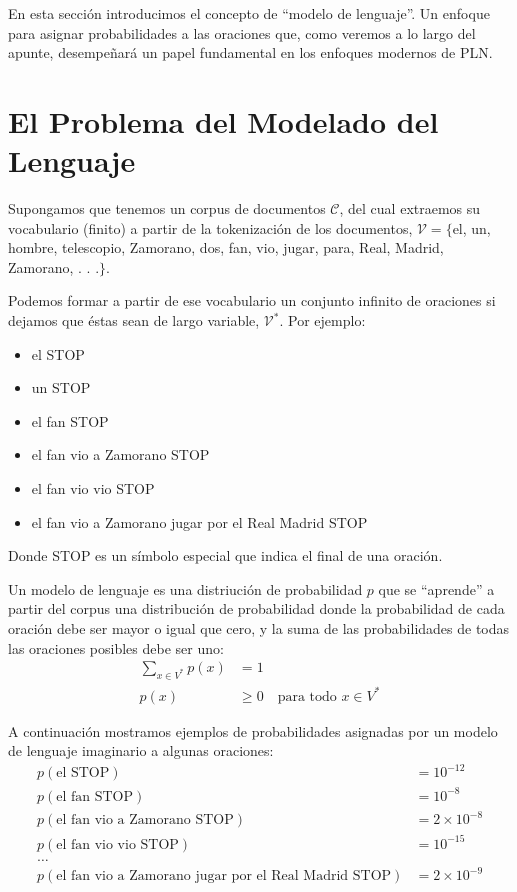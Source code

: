 En esta sección introducimos el concepto de ``modelo de lenguaje''. Un enfoque para asignar probabilidades a las oraciones que, como veremos a lo largo del apunte, desempeñará un papel fundamental en los enfoques modernos de PLN.

\section{El Problema del Modelado del Lenguaje}
Supongamos que tenemos un corpus de documentos $\mathcal{C}$, del cual extraemos su vocabulario (finito) a partir de la tokenización de los documentos, $\mathcal{V} = \{$el, un, hombre, telescopio, Zamorano, dos, fan, vio, jugar, para, Real, Madrid, Zamorano, . . .$\}$.

Podemos formar a partir de ese vocabulario un conjunto infinito de oraciones si dejamos que éstas sean de largo variable, $\mathcal{V}^*$.  Por ejemplo:
\begin{itemize}
\item el STOP
\item un STOP
\item el fan STOP
\item el fan vio a Zamorano STOP
\item el fan vio vio STOP
\item el fan vio a Zamorano jugar por el Real Madrid STOP
\end{itemize}

Donde STOP es un símbolo especial que indica el final de una oración. 

Un modelo de lenguaje es una distriución de probabilidad $p$ que se ``aprende'' a partir del corpus  una distribución de probabilidad donde la probabilidad de cada oración debe ser mayor o igual que cero, y la suma de las probabilidades de todas las oraciones posibles debe ser uno: 
\begin{align*}
\sum_{x\in V^*} p(x) &= 1 \\
p(x) &\geq 0 \quad \text{para todo } x \in V^*
\end{align*}


A continuación mostramos ejemplos de probabilidades asignadas por un modelo de lenguaje imaginario a algunas oraciones:
\begin{align*}
p(\text{el STOP}) &= 10^{-12} \\
p(\text{el fan STOP}) &= 10^{-8} \\
p(\text{el fan vio a Zamorano STOP}) &= 2 \times 10^{-8} \\
p(\text{el fan vio vio STOP}) &= 10^{-15} \\
\ldots \\
p(\text{el fan vio a Zamorano jugar por el Real Madrid STOP}) &= 2 \times 10^{-9}
\end{align*}

